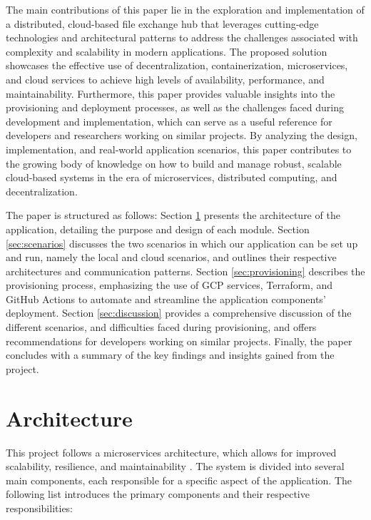 \documentclass[a4paper,fleqn]{cas-dc}
\begin{document}
The main contributions of this paper lie in the exploration and implementation of a distributed, cloud-based file exchange hub that leverages cutting-edge technologies and architectural patterns to address the challenges associated with complexity and scalability in modern applications. The proposed solution showcases the effective use of decentralization, containerization, microservices, and cloud services to achieve high levels of availability, performance, and maintainability. Furthermore, this paper provides valuable insights into the provisioning and deployment processes, as well as the challenges faced during development and implementation, which can serve as a useful reference for developers and researchers working on similar projects. By analyzing the design, implementation, and real-world application scenarios, this paper contributes to the growing body of knowledge on how to build and manage robust, scalable cloud-based systems in the era of microservices, distributed computing, and decentralization.

The paper is structured as follows: Section \ref{sec:architecture} presents the architecture of the application, detailing the purpose and design of each module. Section \ref{sec:scenarios} discusses the two scenarios in which our application can be set up and run, namely the local and cloud scenarios, and outlines their respective architectures and communication patterns. Section \ref{sec:provisioning} describes the provisioning process, emphasizing the use of GCP services, Terraform, and GitHub Actions to automate and streamline the application components' deployment. Section \ref{sec:discussion} provides a comprehensive discussion of the different scenarios, and difficulties faced during provisioning, and offers recommendations for developers working on similar projects. Finally, the paper concludes with a summary of the key findings and insights gained from the project.

\section{Architecture}\label{sec:architecture}

This project follows a microservices architecture, which allows for improved scalability, resilience, and maintainability \cite{Taibi2017}. The system is divided into several main components, each responsible for a specific aspect of the application. The following list introduces the primary components and their respective responsibilities:
\end{document}
